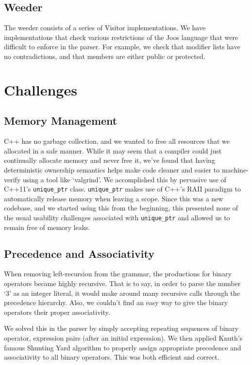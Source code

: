 \documentclass[12pt, titlepage]{article}
\begin{document}
\subsection{Weeder}
The weeder consists of a series of Visitor implementations. We have
implementations that check various restrictions of the Joos language that were
difficult to enforce in the parser. For example, we check that modifier lists
have no contradictions, and that members are either public or protected.

\section{Challenges}
\subsection{Memory Management}
C++ has no garbage collection, and we wanted to free all resources that we
allocated in a safe manner. While it may seem that a compiler could just
continually allocate memory and never free it, we've found that having
deterministic ownership semantics helps make code cleaner and easier to
machine-verify using a tool like `valgrind'. We accomplished this by pervasive
use of C++11's \verb+unique_ptr+ class. \verb+unique_ptr+ makes use of C++'s
RAII paradigm to automatically release memory when leaving a scope. Since this
was a new codebase, and we started using this from the beginning, this
presented none of the usual usability challenges associated with
\verb+unique_ptr+ and allowed us to remain free of memory leaks.

\subsection{Precedence and Associativity}
When removing left-recursion from the grammar, the productions for binary
operators became highly recursive. That is to say, in order to parse the number
`3' as an integer literal, it would make around many recursive calls through
the precedence hierarchy. Also, we couldn't find an easy way to give the binary
operators their proper associativity.

We solved this in the parser by simply accepting repeating sequences of binary
operator, expression pairs (after an initial expression). We then applied
Knuth's famous Shunting Yard algorithm to properly assign appropriate
precedence and associativity to all binary operators. This was both efficient
and correct.
\end{document}
